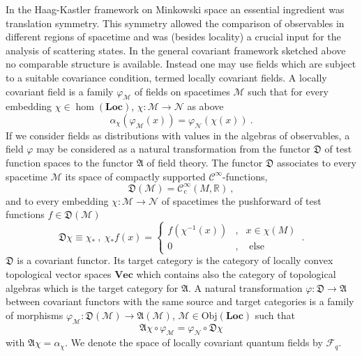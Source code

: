 \documentclass[11pt]{article}
\newcommand{\Fcal}{\mathcal{F}}
\newcommand{\Ncal}{\mathcal{N}}
\newcommand{\Mcal}{\mathcal{M}}
\newcommand{\Loc}{\mathrm{\mathbf{Loc}}}       %
\newcommand{\Vect}{\mathrm{\mathbf{Vec}}}       %
\newcommand{\RR}{\mathbb{R}}           %
\newcommand{\ph}{\varphi}
\newcommand{\1}{\mathds{1}}                         %
\newcommand{\be}{\begin{equation}}
\newcommand{\ee}{\end{equation}}
\begin{document}
In the Haag-Kastler framework on Minkowski space an essential ingredient was translation symmetry. This symmetry allowed the comparison of observables in different regions of spacetime and was  (besides locality) a crucial input for the analysis of scattering states. In the general covariant framework sketched above no comparable structure is available. Instead one may use fields which are subject to a suitable covariance condition, termed locally covariant fields. A locally covariant field is a family $\ph_\Mcal$ of fields on spacetimes $\Mcal$ such that for every embedding $\chi\in\hom(\Loc)$, $\chi:\Mcal\to \Ncal$ as above
\be
\alpha_{\chi}(\ph_\Mcal(x))=\ph_\Ncal(\chi(x)) \ .
\ee
If we consider fields as distributions with values in the algebras of observables, a field $\ph$ may be considered as a natural transformation from the functor $\mathfrak{D}$ of test function spaces to the functor $\mathfrak{A}$ of field theory.
The functor $\mathfrak{D}$ associates to every spacetime $\Mcal$ its space of compactly supported $\mathcal{C}^{\infty}$-functions,
\be
\mathfrak{D}(\Mcal)=\mathcal{C}^{\infty}_{\mathrm{c}}(M,\RR)\ ,
\ee
and to every embedding $\chi:\Mcal\to \Ncal$ of spacetimes the pushforward of test functions $f\in\mathfrak{D}(\Mcal)$
\be
\mathfrak{D}\chi\equiv \chi_*\ ,\ \chi_*f(x)=\left\{ \begin{array}{ccc}
                                                                                    f(\chi^{-1}(x)) &,&x\in\chi(M)\\
                                                                                    0                    &,&\text{ else}
                                                                                    \end{array}
                                                                           \right.\,.
\ee
$\mathfrak{D}$ is a covariant functor. Its target category is the category of locally convex topological vector spaces $\Vect$ which contains also the category of topological algebras which is the target category for $\mathfrak{A}$. A natural transformation $\ph:\mathfrak{D}\to\mathfrak{A}$ between covariant functors with the same source and target categories is a family of morphisms $\ph_{\Mcal}:\mathfrak{D}(\Mcal)\to\mathfrak{A}(\Mcal)$, $\Mcal\in \mathrm{Obj}(\Loc)$ such that
\be
\mathfrak{A}\chi\circ\ph_{\Mcal}=\ph_{\Ncal}\circ\mathfrak{D}\chi
\ee
with $\mathfrak{A}\chi=\alpha_{\chi}$. We denote the space of locally covariant quantum fields by $\Fcal_q$.
\end{document}
